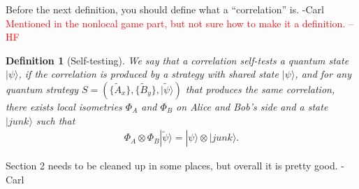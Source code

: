 \documentclass[11pt,letterpaper]{article}
\newcommand{\ket}[1]{|#1\rangle}
\newcommand{\x}{\otimes}
\newcommand{\calX}{\mathcal{X}}
\newcommand{\calY}{\mathcal{Y}}
\newcommand{\calA}{\mathcal{A}}
\newcommand{\calB}{\mathcal{B}}
\newcommand{\1}{\mathbb{1}}
\newcommand{\EPR}[1]{\Sigma^{(#1)}}
\newcommand{\tA}{\tilde{A}}
\newcommand{\tB}{\tilde{B}}
\newcommand{\tpsi}{\tilde{\psi}}
\newcommand{\pr}[2]{P(#1|#2)}
\def\carl#1{{\color{blue} #1 -Carl}}
\newcommand{\hf}[1]{\textcolor{red}{#1}}
\newtheorem{definition}[theorem]{Definition}
\theoremstyle{definition}
\begin{document}


\carl{Before the next definition, you should define what a ``correlation'' is.}
\hf{Mentioned in the nonlocal game part, but not sure how to make it a definition. --HF}
\begin{definition}[Self-testing]
	We say that a correlation self-tests a quantum state $\ket{\psi}$, if 
	the correlation is produced by a strategy with shared state $\ket{\psi}$, and 
	for any quantum strategy $S = ( \{\tA_x\}, \{\tB_y\}, \ket{\tpsi})$ that produces the same correlation,
	there exists local isometries $\Phi_A$ and $\Phi_B$ on Alice and Bob's side and a state $\ket{junk}$ 
	such that 	
	\begin{align*}
		\Phi_A \x \Phi_B \ket{\tpsi} =  \ket{\psi} \x \ket{junk}.
	\end{align*}
\end{definition}


\carl{Section 2 needs to be cleaned up in some places, but overall it is pretty good.}
\end{document}
